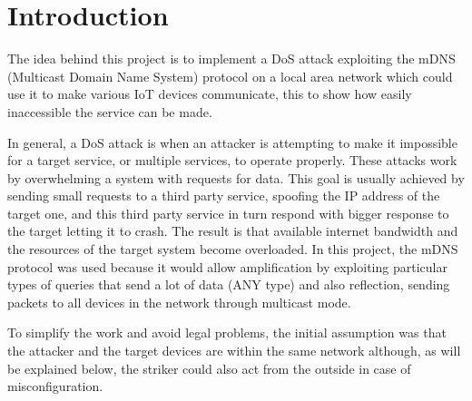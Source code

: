 \documentclass[fleqn, 11pt]{SelfArx} %
\affiliation{\textit{Department of Computer Engineering, University of Pavia, Pavia, Italy}} %
\affiliation{\textit{Enterprise Digital Infrastructure}} %
\begin{document}
\maketitle %

\tableofcontents %

\thispagestyle{empty} %


\section{Introduction} %
The idea behind this project is to implement a DoS attack exploiting the mDNS (Multicast Domain Name System) protocol \cite{rfc6762} on a local area network which could use it to make various IoT devices communicate, this to show how easily inaccessible the service can be made. \newline

In general, a DoS attack is when an attacker is attempting to make it impossible for a target service, or multiple services, to operate properly. These attacks work by overwhelming a system with requests for data. \newline
This goal is usually achieved by sending small requests to a third party service, spoofing the IP address of the target one, and this third party service in turn respond with bigger response to the target letting it to crash. \newline The result is that available internet bandwidth and the resources of the target system become overloaded.\newline
In this project, the mDNS protocol was used because it would allow amplification by exploiting particular types of queries that send a lot of data (ANY type) and also reflection, sending packets to all devices in the network through multicast mode. \newline

To simplify the work and avoid legal problems, the initial assumption was that the attacker and the target devices are within the same network although, as will be explained below, the striker could also act from the outside in case of misconfiguration.
\end{document}
